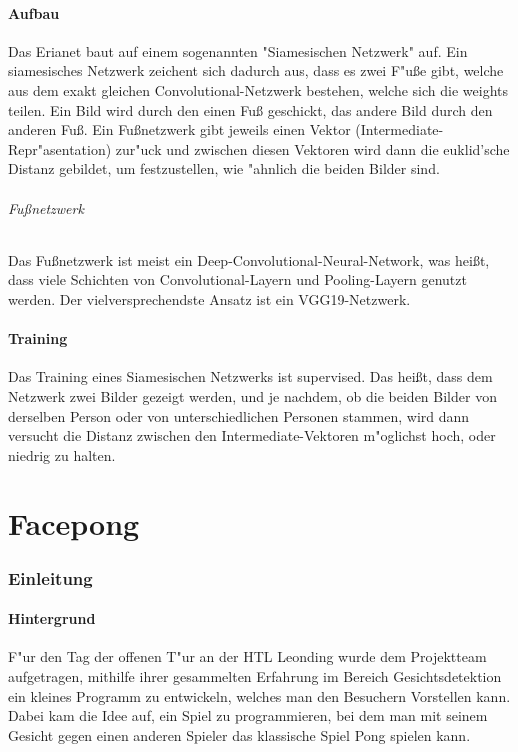\documentclass[12pt]{article}
\begin{document}
\subsection{Aufbau}
Das Erianet baut auf einem sogenannten "Siamesischen Netzwerk" auf.
Ein siamesisches Netzwerk zeichent sich dadurch aus, dass es zwei
{\glqq}F"u{\ss}e{\grqq} gibt, welche aus dem exakt gleichen Convolutional-Netzwerk 
bestehen, welche sich die weights teilen. Ein Bild wird durch den
einen Fu{\ss} geschickt, das andere Bild durch den anderen Fu{\ss}.
Ein Fu{\ss}netzwerk gibt jeweils einen Vektor (Intermediate-Repr"asentation)
zur"uck und zwischen diesen Vektoren wird dann die euklid'sche Distanz
gebildet, um festzustellen, wie "ahnlich die beiden Bilder sind.
\paragraph{Fu{\ss}netzwerk}
Das Fu{\ss}netzwerk ist meist ein Deep-Convolutional-Neural-Network, was hei{\ss}t,
dass viele Schichten von Convolutional-Layern und Pooling-Layern genutzt werden.
Der vielversprechendste Ansatz ist ein VGG19-Netzwerk.
\subsection{Training}
Das Training eines Siamesischen Netzwerks ist supervised. Das hei{\ss}t, dass
dem Netzwerk zwei Bilder gezeigt werden, und je nachdem, ob die beiden Bilder
von derselben Person oder von unterschiedlichen Personen stammen, wird dann 
versucht die Distanz zwischen den Intermediate-Vektoren m"oglichst hoch, oder 
niedrig zu halten.

\part{Facepong}
\section{Einleitung}
\subsection{Hintergrund}
F"ur den Tag der offenen T"ur an der HTL Leonding wurde dem Projektteam
aufgetragen, mithilfe ihrer gesammelten Erfahrung im Bereich Gesichtsdetektion
ein kleines Programm zu entwickeln, welches man den Besuchern Vorstellen kann.
Dabei kam die Idee auf, ein Spiel zu programmieren, bei dem man mit seinem Gesicht
gegen einen anderen Spieler das klassische Spiel {\glqq} Pong{\grqq} spielen kann.
\end{document}

